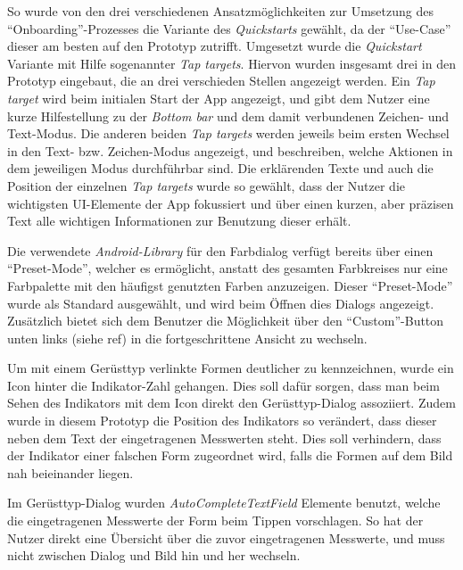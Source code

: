 So wurde von den drei verschiedenen Ansatzmöglichkeiten zur Umsetzung des ``Onboarding''-Prozesses die Variante des \emph{Quickstarts} gewählt, da der ``Use-Case'' dieser am besten auf den Prototyp zutrifft.
Umgesetzt wurde die \emph{Quickstart} Variante mit Hilfe sogenannter \emph{Tap targets}.
Hiervon wurden insgesamt drei in den Prototyp eingebaut, die an drei verschieden Stellen angezeigt werden.
Ein \emph{Tap target} wird beim initialen Start der App angezeigt, und gibt dem Nutzer eine kurze Hilfestellung zu der \emph{Bottom bar} und dem damit verbundenen Zeichen- und Text-Modus.
Die anderen beiden \emph{Tap targets} werden jeweils beim ersten Wechsel in den Text- bzw. Zeichen-Modus angezeigt, und beschreiben, welche Aktionen in dem jeweiligen Modus durchführbar sind.
Die erklärenden Texte und auch die Position der einzelnen \emph{Tap targets} wurde so gewählt, dass der Nutzer die wichtigsten UI-Elemente der App fokussiert und über einen kurzen, aber präzisen Text alle wichtigen Informationen zur Benutzung dieser erhält. \\

Die verwendete \emph{Android-Library} für den Farbdialog verfügt bereits über einen ``Preset-Mode'', welcher es ermöglicht, anstatt des gesamten Farbkreises nur eine Farbpalette mit den häufigst genutzten Farben anzuzeigen.
Dieser ``Preset-Mode'' wurde als Standard ausgewählt, und wird beim Öffnen dies Dialogs angezeigt.
Zusätzlich bietet sich dem Benutzer die Möglichkeit über den ``Custom''-Button unten links (siehe ref) in die fortgeschrittene Ansicht zu wechseln. \\

Um mit einem Gerüsttyp verlinkte Formen deutlicher zu kennzeichnen, wurde ein Icon  hinter die Indikator-Zahl gehangen.
Dies soll dafür sorgen, dass man beim Sehen des Indikators mit dem Icon direkt den Gerüsttyp-Dialog assoziiert.
Zudem wurde in diesem Prototyp die Position des Indikators so verändert, dass dieser neben dem Text der eingetragenen Messwerten steht.
Dies soll verhindern, dass der Indikator einer falschen Form zugeordnet wird, falls die Formen auf dem Bild nah beieinander liegen. \\

Im Gerüsttyp-Dialog wurden \emph{AutoCompleteTextField} Elemente benutzt, welche die eingetragenen Messwerte der Form beim Tippen vorschlagen.
So hat der Nutzer direkt eine Übersicht über die zuvor eingetragenen Messwerte, und muss nicht zwischen Dialog und Bild hin und her wechseln. \\

